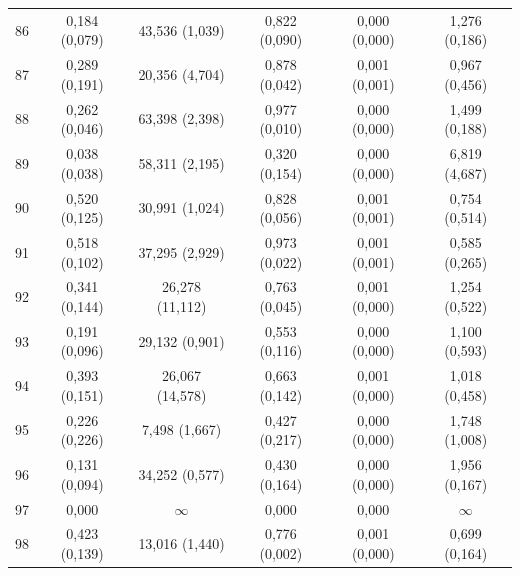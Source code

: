 \begin{tabular}{l c c c c c}
86 & 0,184 (0,079) & 43,536 (1,039) & 0,822 (0,090) & 0,000 (0,000) & 1,276 (0,186) \\
87 & 0,289 (0,191) & 20,356 (4,704) & 0,878 (0,042) & 0,001 (0,001) & 0,967 (0,456) \\
88 & 0,262 (0,046) & 63,398 (2,398) & 0,977 (0,010) & 0,000 (0,000) & 1,499 (0,188) \\
89 & 0,038 (0,038) & 58,311 (2,195) & 0,320 (0,154) & 0,000 (0,000) & 6,819 (4,687) \\
90 & 0,520 (0,125) & 30,991 (1,024) & 0,828 (0,056) & 0,001 (0,001) & 0,754 (0,514) \\
91 & 0,518 (0,102) & 37,295 (2,929) & 0,973 (0,022) & 0,001 (0,001) & 0,585 (0,265) \\
92 & 0,341 (0,144) & 26,278 (11,112) & 0,763 (0,045) & 0,001 (0,000) & 1,254 (0,522) \\
93 & 0,191 (0,096) & 29,132 (0,901) & 0,553 (0,116) & 0,000 (0,000) & 1,100 (0,593) \\
94 & 0,393 (0,151) & 26,067 (14,578) & 0,663 (0,142) & 0,001 (0,000) & 1,018 (0,458) \\
95 & 0,226 (0,226) & 7,498 (1,667) & 0,427 (0,217) & 0,000 (0,000) & 1,748 (1,008) \\
96 & 0,131 (0,094) & 34,252 (0,577) & 0,430 (0,164) & 0,000 (0,000) & 1,956 (0,167) \\
97 & 0,000 & $\infty$ & 0,000 & 0,000 & $\infty$ \\
98 & 0,423 (0,139) & 13,016 (1,440) & 0,776 (0,002) & 0,001 (0,000) & 0,699 (0,164) \\
\hline 
 \end{tabular}
